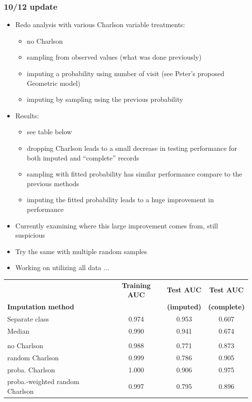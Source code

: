 \documentclass[12pt]{article}
\begin{document}
\pagebreak
\subsubsection*{10/12 update}

\begin{itemize}
	\item Redo analysis with various Charlson variable treatments:
	\begin{itemize}
		\item no Charlson
		\item sampling from observed values (what was done previously)
		\item imputing a probability using number of visit (see Peter's proposed Geometric model)
		\item imputing by sampling using the previous probability
	\end{itemize}
	\item Results:
	\begin{itemize}
		\item see table below
		\item dropping Charlson leads to a small decrease in testing performance for both imputed and ``complete'' records
		\item sampling with fitted probability has similar performance compare to the previous methods
		\item imputing the fitted probability leads to a huge improvement in performance
	\end{itemize}
	\item Currently examining where this large improvement comes from, still suspicious
	\item Try the same with multiple random samples
	\item Working on utilizing all data ...
\end{itemize}

\begin{table}[ht]
\centering
\begin{tabular}{lccc}
  \toprule
 & \textbf{Training AUC} & \textbf{Test AUC} & \textbf{Test AUC} \\
\textbf{Imputation method}& & \textbf{(imputed)} & \textbf{(complete)} \\
  \midrule
Separate class & 0.974 & 0.953 & 0.607 \\ \addlinespace
  Median & 0.990 & 0.941 & 0.674 \\ \addlinespace
  \multicolumn{4}{l}{\textbf{Simple random sample}} \\
  no Charlson & 0.988 & 0.771 & 0.873 \\ 
  random Charlson & 0.999 & 0.786 & 0.905 \\ 
  proba. Charlson & 1.000 & 0.906 & 0.975 \\ 
  proba.-weighted random Charlson & 0.997 & 0.795 & 0.896 \\ 
   \bottomrule
\end{tabular}
\end{table}
\end{document}
